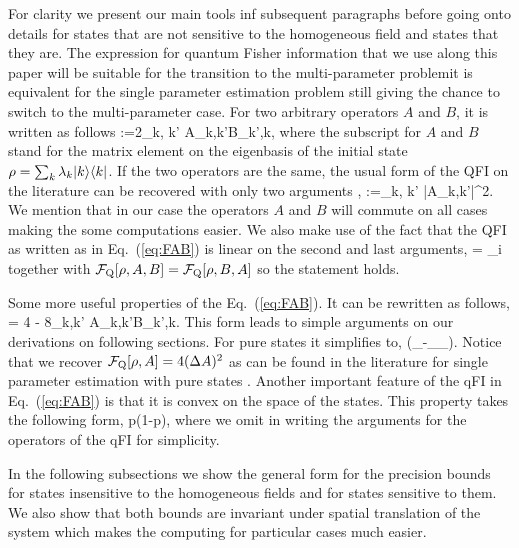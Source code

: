For clarity we present our main tools inf subsequent paragraphs before going onto details for states that are not sensitive to the homogeneous field and states that they are.
The expression for quantum Fisher information that we use along this paper will be suitable for the transition to the multi-parameter problem\ie it is equivalent for the single parameter estimation problem still giving the chance to switch to the multi-parameter case.
For two arbitrary operators $A$ and $B$, it is written as follows
\be
  \label{eq:FAB}
  \qfi[\rho,A,B]:=2\sum_{k, k'}
  {A}_{k,k'}{B}_{k',k},
\ee
where the subscript for $A$ and $B$ stand for the matrix element on the eigenbasis of the initial state $\rho = \sum_k\lambda_k\vert k \rangle\langle k \vert$.
If the two operators are the same, the usual form of the QFI on the literature can be recovered with only two arguments \citep{Paris2009,Braunstein1994,Holevo1982,Helstrom1976,Petz2002,Petz2008},
\be
  \qfi[\rho,A,A]:=\sum_{k, k'}
  |{A}_{k,k'}|^2.
\ee
We mention that in our case the operators $A$ and $B$ will commute on all cases making the some computations easier.
We also make use of the fact that the QFI as written as in Eq.~(\ref{eq:FAB}) is linear on the second and last arguments,
\be
  \label{eq:qfi-linear-in-arguments}
   = \sum_i \qfi[\rho,A,b_i]
\ee
together with $\mathcal{F}_{\text{Q}}[\rho, A, B] = \mathcal{F}_{\text{Q}}[\rho, B,A]$ so the statement holds.

Some more useful properties of the Eq.~(\ref{eq:FAB}).
It can be rewritten as follows,
\be
  \label{eq:QFI for two operators rewrited}
  \qfi[\rho, A, B] = 4 
  - 8\sum_{k,k'}
  {A}_{k,k'}{B}_{k',k}.
\ee
This form leads to simple arguments on our derivations on following sections.
For pure states it simplifies to,
\be
  \label{eq:QFI_pure}
  \left(_{\psi}-_{\psi}_{\psi}\right).
\ee
Notice that we recover $\mathcal{F}_{\text{Q}}[\rho,A]=4(\Delta A)^2$ as can be found in the literature for single parameter estimation with pure states \citep{Paris2009,Toth2013}.
Another important feature of the qFI in Eq.~(\ref{eq:FAB}) is that it is convex on the space of the states.
This property takes the following form,
\be
  \leq
  p\qfi[\rho_1]{+}(1{-}p)\qfi[\rho_2],
\ee
where we omit in writing the arguments for the operators of the qFI for simplicity.

In the following subsections we show the general form for the precision bounds for states insensitive to the homogeneous fields and for states sensitive to them. We also show that both bounds are invariant under spatial translation of the system which makes the computing for particular cases much easier.

